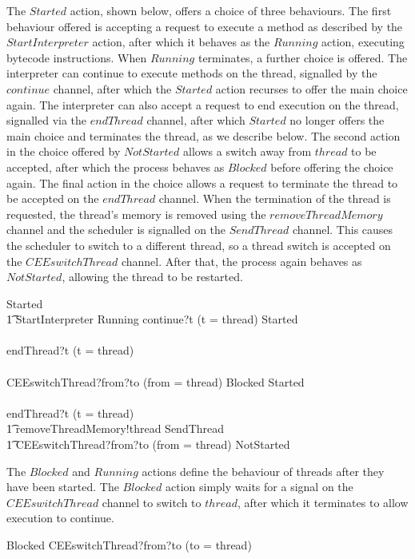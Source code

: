 The $Started$ action, shown below, offers a choice of three
behaviours.
The first behaviour offered is accepting a request to execute a method
as described by the $StartInterpreter$ action, after which it behaves
as the $Running$ action, executing bytecode instructions.
When $Running$ terminates, a further choice is offered.
The interpreter can continue to execute methods on the thread,
signalled by the $continue$ channel, after which the $Started$ action
recurses to offer the main choice again.
The interpreter can also accept a request to end execution on the
thread, signalled via the $endThread$ channel, after which $Started$
no longer offers the main choice and terminates the thread, as we
describe below.
The second action in the choice offered by $NotStarted$ allows a
switch away from $thread$ to be accepted, after which the process
behaves as $Blocked$ before offering the choice again.
The final action in the choice allows a request to terminate the
thread to be accepted on the $endThread$ channel.
When the termination of the thread is requested, the thread's memory
is removed using the $removeThreadMemory$ channel and the scheduler is
signalled on the $SendThread$ channel.
This causes the scheduler to switch to a different thread, so a thread
switch is accepted on the $CEEswitchThread$ channel.
After that, the process again behaves as $NotStarted$, allowing the
thread to be restarted.
\begin{circusaction}
  Started \circdef \\
  \t1 \circblockbegin
  StartInterpreter \circseq Running \circseq \circblockbegin
  continue?t \prefixcolon (t = thread) \then Started \\
  {} \extchoice {} \\
  endThread?t \prefixcolon (t = thread) \then \Skip
  \circblockend \\
  {} \extchoice {} \\
  CEEswitchThread?from?to \prefixcolon (from = thread) \then Blocked \circseq Started \\
  {} \extchoice {} \\
  endThread?t \prefixcolon (t = thread) \then \Skip
  \circblockend \circseq \\
  \t1 removeThreadMemory!thread \then SendThread \\
  \t1 {} \then CEEswitchThread?from?to \prefixcolon (from = thread) \then NotStarted
\end{circusaction}

The $Blocked$ and $Running$ actions define the behaviour of threads
after they have been started.
The $Blocked$ action simply waits for a signal on the
$CEEswitchThread$ channel to switch to $thread$, after which it
terminates to allow execution to continue.
\begin{circusaction}
  Blocked \circdef CEEswitchThread?from?to \prefixcolon (to = thread) \then \Skip
\end{circusaction}

